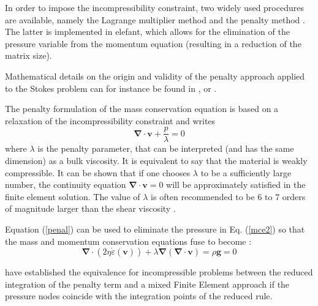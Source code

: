 \label{sec_penalty}


In order to impose the incompressibility constraint, two widely used procedures are available, namely the 
Lagrange multiplier method and the penalty method \cite{bathe82,hugh}. The latter is implemented in {\sc elefant}, which allows for the elimination of the pressure variable from the momentum equation (resulting in a reduction of the matrix size).%

Mathematical details on the origin and validity of the penalty approach applied to the Stokes problem can for instance be found in  \cite{cuss86}, \cite{redd82} or \cite{gunz89}.

The penalty formulation of the mass conservation equation is based on a relaxation of the incompressibility constraint and writes 
\begin{equation}
{\bm \nabla}\cdot {\bm v} + \frac{p}{\lambda} = 0 \label{penal}
\end{equation}
where $\lambda$ is the penalty parameter, that can be interpreted (and has the same dimension) as a bulk viscosity. It is 
equivalent to say that the material is weakly compressible. It can be shown that if one chooses $\lambda$ to be a 
sufficiently large number, the continuity equation $ {\bm \nabla}\cdot {\bm v} = 0$ will be approximately satisfied in the finite element solution. The value of $\lambda$ is often recommended to be 6 to 7 orders of magnitude larger than the shear viscosity \cite{dohu03,hulb79}.


Equation (\ref{penal}) can be used to eliminate the pressure in Eq. (\ref{mce2}) so that the mass and momentum conservation equations fuse to become :
\begin{equation}
{\bm \nabla}\cdot ( 2 \eta \dot\varepsilon({\bm v})) + \lambda {\bm \nabla} ({\bm \nabla }\cdot {\bm v}) = \rho {\bm g} = 0 \label{peneq}
\end{equation}

\cite{mahu78} have established the equivalence for incompressible problems between the reduced integration
of the penalty term and a mixed Finite Element approach if the pressure nodes coincide with the integration points of the reduced rule.

